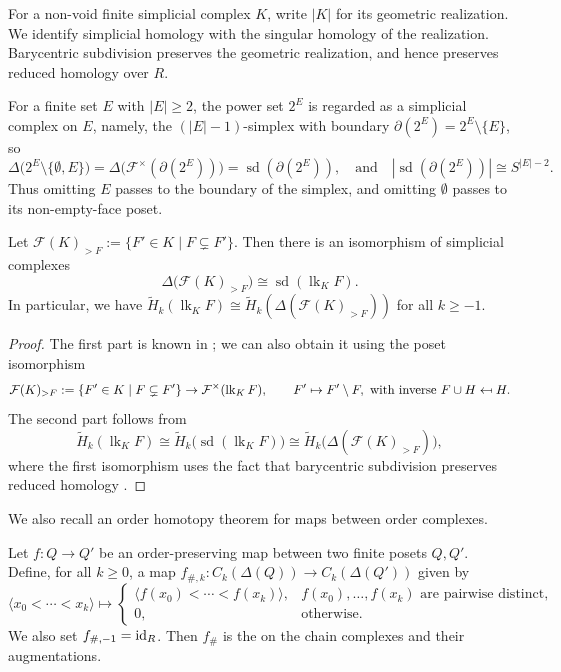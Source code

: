 \documentclass[a4paper,leqno]{amsart}
\begin{document}
For a non-void finite simplicial complex $K$, write $|K|$ for its geometric realization.  We identify simplicial homology with the singular homology of the realization.  Barycentric subdivision preserves the geometric realization, and hence preserves reduced homology over $R$.

For a finite set $E$ with $|E|\geq2$, the power set $2^E$ is regarded as a simplicial complex on $E$, namely, the $(|E|-1)$-simplex with boundary $\partial(2^E)=2^E\setminus\{E\}$, so
\begin{equation}
\Delta\bigl(2^E\setminus\{\emptyset,E\}\bigr)
=\Delta\bigl(\mathcal F^\times(\partial(2^E))\bigr)
=\operatorname{sd}(\partial(2^E)),\quad \text{and}\quad 
|\operatorname{sd}(\partial(2^E))|\cong S^{|E|-2}.
\label{eq:boolean-boundary-sphere}
\end{equation}
Thus omitting $E$ passes to the boundary of the simplex, and omitting $\emptyset$ passes to its non-empty-face poset.

\begin{lem}\label{lem:munkres}
Let $\mathcal F(K)_{>F}:=\{F'\in K\mid F\subsetneq F'\}$.  Then there is an isomorphism of simplicial complexes
\[
\Delta\bigl(\mathcal F(K)_{>F}\bigr)
\cong\operatorname{sd}(\operatorname{lk}_K F).
\]
In particular, we have $\widetilde{H}_k(\operatorname{lk}_KF)\cong \widetilde{H}_k(\Delta(\mathcal{F}(K)_{>F}))$ for all $k\ge -1$.
\end{lem}
\begin{proof}
The first part is known in \cite[Lemma 15.3]{Mun84}; we can also obtain it using the poset isomorphism
\newcommand{\mapsfrom}{\mathrel{\reflectbox{$\mapsto$}}}
\[
\mathcal F(K)_{>F}:=\{F'\in K\mid F\subsetneq F'\} \rightarrow
\mathcal{F}^\times(\operatorname{lk}_K F),
\qquad F'\mapsto F'\setminus F, \text{ with inverse } F\cup H \mapsfrom  H.
\]
The second part follows from
\[
\widetilde{H}_k(\operatorname{lk}_KF)\cong \widetilde{H}_k\big(\operatorname{sd}(\operatorname{lk}_KF)\big) \cong \widetilde{H}_k\big(\Delta(\mathcal{F}(K)_{>F})\big),
\]
where the first isomorphism uses the fact that barycentric subdivision preserves reduced homology \cite[Theorem 17.2]{Mun84}.
\end{proof}

We also recall an order homotopy theorem for maps between order complexes.

Let $f:Q\to Q'$ be an order-preserving map between two finite posets $Q,Q'$.  Define, for all $k\ge 0$, a map $f_{\#,k}:C_k(\Delta(Q))\to C_k(\Delta(Q'))$ given by
\begin{equation}\label{eq:order-presv-map-induced-chain-map}
\langle x_0<\cdots<x_k\rangle \mapsto
\begin{cases}
\langle f(x_0)<\cdots<f(x_k)\rangle, & f(x_0),\ldots,f(x_k)\text{ are pairwise distinct},\\
0,&\text{otherwise}.
\end{cases}
\end{equation}
We also set $f_{\#,-1}=\operatorname{id}_R$. Then $f_\#$ is the  on the chain complexes and their augmentations.
\end{document}
